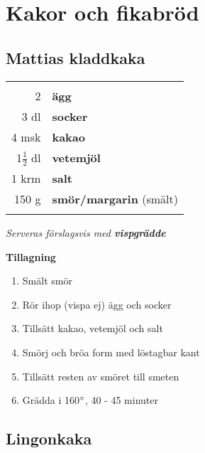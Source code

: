 \documentclass[a4paper,12pt]{article}
\newcommand{\tillb}[1]{\noindent \textit{Serveras förslagsvis med \textbf{#1}} \vspace{1cm}}
\begin{document}

\section{Kakor och fikabröd}

\clearpage

\subsection{Mattias kladdkaka}

\begin{table}[H]
	\begin{tabular}{rl}
	\hline
	&\\
		2 & \textbf{ägg}\\
		3 dl & \textbf{socker}\\
		4 msk & \textbf{kakao}\\
		1$\frac{1}{2}$ dl & \textbf{vetemjöl}\\
		1 krm & \textbf{salt}\\
		150 g & \textbf{smör/margarin} (smält)\\
	&\\
	\hline
	\end{tabular}
\end{table}

\tillb{vispgrädde}

\begin{multicols*}{2}

\noindent \textbf{Tillagning}
\begin{enumerate}
	\itemsep0cm
	\item Smält smör
	\item Rör ihop (vispa ej) ägg och \mbox{socker}
	\item Tillsätt kakao, vetemjöl och salt
	\item Smörj och bröa form med löstagbar kant
	\item Tillsätt resten av smöret till smeten
	\item Grädda i 160$\degree$, 40 - 45 minuter
\end{enumerate}

\end{multicols*}

\clearpage

\subsection{Lingonkaka}
\end{document}
